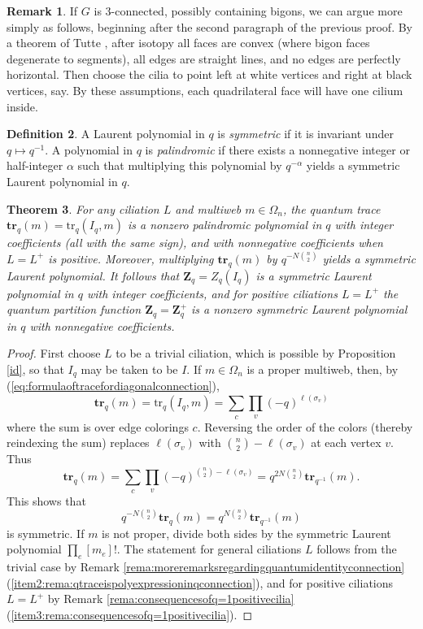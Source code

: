 \documentclass[12pt, reqno]{amsart}
\newtheorem{theo}{Theorem}[section]
\theoremstyle{definition}
\newtheorem{defi}[theo]{Definition}
\newtheorem{rema}[theo]{Remark}
\newcommand{\be}{\begin{equation}}
\newcommand{\ee}{\end{equation}}
\newcommand{\Zqc}{Z_q}%
\newcommand{\Zq}{\mathbf{Z}_q}%
\newcommand{\trqc}{\mathrm{tr}_q}%
\newcommand{\trq}{\mathbf{tr}_q}%
\begin{document}
\begin{rema}\label{3conn} 
If $G$ is $3$-connected, possibly containing bigons, we can argue more simply as follows, beginning after the second paragraph of the previous proof.   By a theorem of Tutte \cite{Tutte}, after isotopy all faces are convex (where bigon faces degenerate to segments), all edges are straight lines, and no edges are perfectly horizontal.  Then choose the cilia to point left at white vertices and right at black vertices, say.  By these assumptions, each quadrilateral face will have one cilium inside.  
\end{rema}

\begin{defi}
A Laurent polynomial in $q$ is \emph{symmetric} if it is invariant under $q\mapsto q^{-1}$.  A polynomial in $q$ is \emph{palindromic} if there exists a nonnegative integer or half-integer $\alpha$ such that multiplying this polynomial by $q^{-\alpha}$ yields a symmetric Laurent polynomial in $q$.  
\end{defi}

\begin{theo}\label{theo:symmetricZq}
For any ciliation $L$ and multiweb $m\in\Omega_n$, the quantum trace $\trq(m)=\trqc(I_q,m)$ is a nonzero palindromic   polynomial in $q$ with integer coefficients (all with the same sign), and with nonnegative coefficients when $L=L^+$ is positive.   Moreover, multiplying $\trq(m)$ by $q^{-N\binom{n}{2}}$ yields a symmetric Laurent polynomial.    It follows that $\Zq=\Zqc(I_q)$ is a symmetric Laurent polynomial in $q$ with integer coefficients,   and for positive ciliations $L=L^+$ the quantum partition function $\Zq=\Zq^+$ is a nonzero symmetric Laurent polynomial in $q$ with nonnegative coefficients. 
\end{theo}

\begin{proof}  
First choose $L$ to be a trivial ciliation, which is possible by Proposition \ref{id},    so that $I_q$ may be taken to be $I$.  If $m\in\Omega_n$ is a proper multiweb, then, by (\ref{eq:formulaoftracefordiagonalconnection}),
\be\label{eq:trivialciliaformula}
\trq(m) =\trqc(I_q,m) =  \sum_c\prod_v (-q)^{\ell(\sigma_v)}
\ee 
where the sum is over edge colorings $c$. Reversing the order of the colors (thereby reindexing the sum) replaces $\ell(\sigma_v)$ with $\binom{n}{2}-\ell(\sigma_v)$ at each vertex $v$. Thus 
$$
\trq(m)=\sum_c \prod_v (-q)^{\binom{n}{2}-\ell(\sigma_v)} = q^{2N\binom{n}{2}}\mathbf{tr}_{q^{-1}}(m).
$$ 
This shows that  
$$
q^{-N\binom{n}{2}}\trq(m) = q^{N\binom{n}{2}}\mathbf{tr}_{q^{-1}}(m)
$$ 
is symmetric. If $m$ is not proper, divide both sides by the symmetric Laurent polynomial $\prod_e [m_e]!$.  The statement for general ciliations $L$ follows from the trivial case by Remark \ref{rema:moreremarksregardingquantumidentityconnection} (\ref{item2:rema:qtraceispolyexpressioninqconnection}), and for positive ciliations $L=L^+$ by Remark \ref{rema:consequencesofq=1positivecilia} (\ref{item3:rema:consequencesofq=1positivecilia}).
\end{proof}
\end{document}
